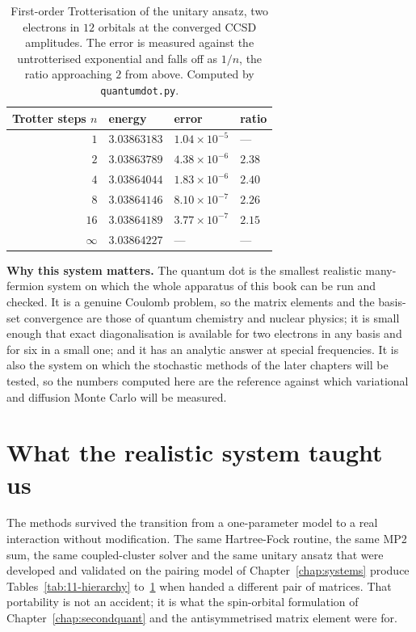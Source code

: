 \begin{table}[h]
\centering
\renewcommand{\arraystretch}{1.25}
\setlength{\tabcolsep}{14pt}
\begin{tabular}{rlll}
\toprule
Trotter steps $n$ & energy & error & ratio\\
\midrule
$1$  & $3.03863183$ & $1.04\times10^{-5}$ & ---\\
$2$  & $3.03863789$ & $4.38\times10^{-6}$ & $2.38$\\
$4$  & $3.03864044$ & $1.83\times10^{-6}$ & $2.40$\\
$8$  & $3.03864146$ & $8.10\times10^{-7}$ & $2.26$\\
$16$ & $3.03864189$ & $3.77\times10^{-7}$ & $2.15$\\
\midrule
$\infty$ & $3.03864227$ & --- & ---\\
\bottomrule
\end{tabular}
\caption{First-order Trotterisation of the unitary ansatz, two electrons in
$12$ orbitals at the converged CCSD amplitudes.  The error is measured against
the untrotterised exponential and falls off as $1/n$, the ratio approaching
$2$ from above.  Computed by \texttt{quantumdot.py}.}
\label{tab:11-trotter}
\end{table}

\begin{notebox}
\textbf{Why this system matters.}  The quantum dot is the smallest realistic
many-fermion system on which the whole apparatus of this book can be run and
checked.  It is a genuine Coulomb problem, so the matrix elements and the
basis-set convergence are those of quantum chemistry and nuclear physics; it
is small enough that exact diagonalisation is available for two electrons in
any basis and for six in a small one; and it has an analytic answer at special
frequencies.  It is also the system on which the stochastic methods of the
later chapters will be tested, so the numbers computed here are the reference
against which variational and diffusion Monte Carlo will be measured.
\end{notebox}

\section{What the realistic system taught us}
\label{sec:qdsummary}

The methods survived the transition from a one-parameter model to a real
interaction without modification.  The same Hartree-Fock routine, the same
MP2 sum, the same coupled-cluster solver and the same unitary ansatz that were
developed and validated on the pairing model of Chapter~\ref{chap:systems}
produce Tables~\ref{tab:11-hierarchy} to~\ref{tab:11-trotter} when handed a
different pair of matrices.  That portability is not an accident; it is what
the spin-orbital formulation of Chapter~\ref{chap:secondquant} and the
antisymmetrised matrix element were for.

